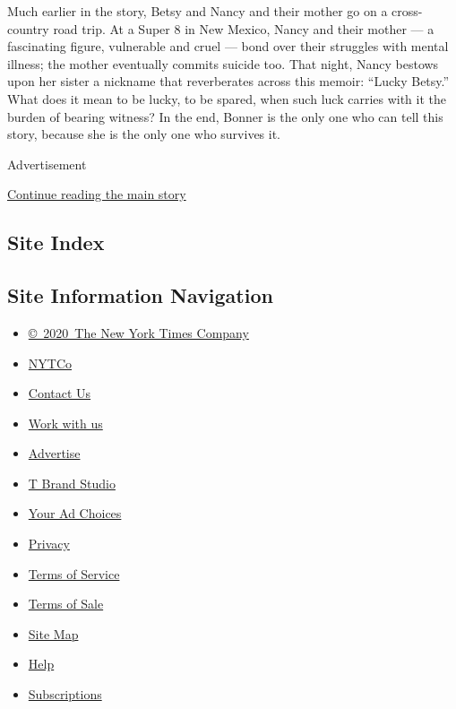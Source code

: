 Much earlier in the story, Betsy and Nancy and their mother go on a
cross-country road trip. At a Super 8 in New Mexico, Nancy and their
mother --- a fascinating figure, vulnerable and cruel --- bond over
their struggles with mental illness; the mother eventually commits
suicide too. That night, Nancy bestows upon her sister a nickname that
reverberates across this memoir: ``Lucky Betsy.'' What does it mean to
be lucky, to be spared, when such luck carries with it the burden of
bearing witness? In the end, Bonner is the only one who can tell this
story, because she is the only one who survives it.

Advertisement

\protect\hyperlink{after-bottom}{Continue reading the main story}

\hypertarget{site-index}{%
\subsection{Site Index}\label{site-index}}

\hypertarget{site-information-navigation}{%
\subsection{Site Information
Navigation}\label{site-information-navigation}}

\begin{itemize}
\tightlist
\item
  \href{https://help.nytimes.com/hc/en-us/articles/115014792127-Copyright-notice}{©~2020~The
  New York Times Company}
\end{itemize}

\begin{itemize}
\tightlist
\item
  \href{https://www.nytco.com/}{NYTCo}
\item
  \href{https://help.nytimes.com/hc/en-us/articles/115015385887-Contact-Us}{Contact
  Us}
\item
  \href{https://www.nytco.com/careers/}{Work with us}
\item
  \href{https://nytmediakit.com/}{Advertise}
\item
  \href{http://www.tbrandstudio.com/}{T Brand Studio}
\item
  \href{https://www.nytimes.com/privacy/cookie-policy\#how-do-i-manage-trackers}{Your
  Ad Choices}
\item
  \href{https://www.nytimes.com/privacy}{Privacy}
\item
  \href{https://help.nytimes.com/hc/en-us/articles/115014893428-Terms-of-service}{Terms
  of Service}
\item
  \href{https://help.nytimes.com/hc/en-us/articles/115014893968-Terms-of-sale}{Terms
  of Sale}
\item
  \href{https://spiderbites.nytimes.com}{Site Map}
\item
  \href{https://help.nytimes.com/hc/en-us}{Help}
\item
  \href{https://www.nytimes.com/subscription?campaignId=37WXW}{Subscriptions}
\end{itemize}
